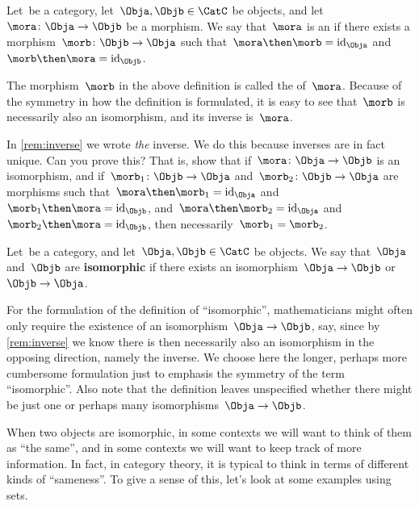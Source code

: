 \begin{ctdefinition}[Isomorphism]
    Let~\CatC be a category, let~$\Obja,\Objb \in \CatC$ be objects, and let~$\mora \colon \Obja \to \Objb$ be a morphism. We say that~$\mora$ is an \emph{} if there exists a morphism~$\morb\colon \Objb \to \Obja$ such that~$\mora \then \morb = \text{id}_\Obja$ and~$\morb \then \mora = \text{id}_\Objb$.
\end{ctdefinition}

\begin{remark}
    \label{rem:inverse}
    The morphism~$\morb$ in the above definition is called the \textbf{} of~$\mora$. Because of the symmetry in how the definition is formulated, it is easy to see that~$\morb$ is necessarily also an isomorphism, and its inverse is~$\mora$.
\end{remark}

\begin{exercise}
    In \cref{rem:inverse} we wrote \emph{the} inverse. We do this because inverses are in fact unique. Can you prove this?
    That is, show that if~$\mora \colon \Obja \to \Objb$ is an isomorphism, and if~$\morb_1\colon \Objb \to \Obja$ and~$\morb_2\colon \Objb \to \Obja$ are morphisms such that~$\mora \then \morb_1 = \text{id}_\Obja$ and~$\morb_1 \then \mora = \text{id}_\Objb$, and~$\mora \then \morb_2 = \text{id}_\Obja$ and~$\morb_2 \then \mora = \text{id}_\Objb$, then necessarily~$\morb_1 = \morb_2$.
\end{exercise}

\begin{ctdefinition}[Isomorphic]
    Let~\CatC be a category, and let~$\Obja,\Objb \in \CatC$ be objects. We say that~$\Obja$ and~$\Objb$ are \textbf{isomorphic} if there exists an isomorphism~$\Obja \to \Objb$ or~$\Objb \to \Obja$.
\end{ctdefinition}

For the formulation of the definition of ``isomorphic'', mathematicians might often only require the existence of an isomorphism~$\Obja \to \Objb$, say, since by \cref{rem:inverse} we know there is then necessarily also an isomorphism in the opposing direction, namely the inverse. We choose here the longer, perhaps more cumbersome formulation just to emphasis the symmetry of the term ``isomorphic''. Also note that the definition leaves unspecified whether there might be just one or perhaps many isomorphisms~$\Obja \to \Objb$.

When two objects are isomorphic, in some contexts we will want to think of them as ``the same'', and in some contexts we will want to keep track of more information. In fact, in category theory, it is typical to think in terms of different kinds of ``sameness''. To give a sense of this, let's look at some examples using sets.

